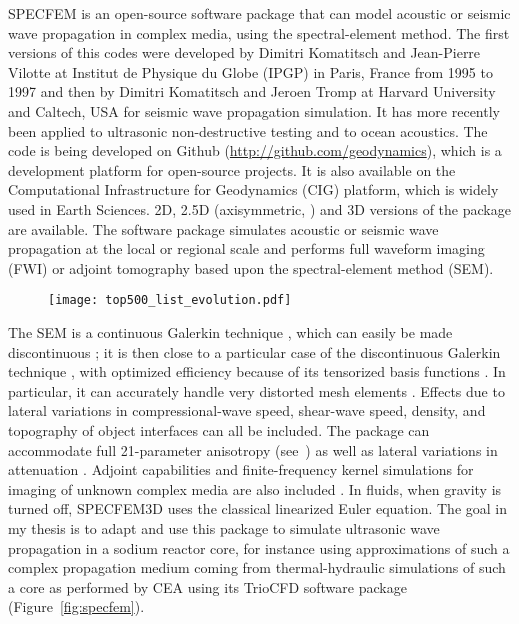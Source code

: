 SPECFEM is an open-source software package that can model acoustic or seismic wave propagation in complex media, using the spectral-element method.
The first versions of this codes were developed by Dimitri Komatitsch and Jean-Pierre Vilotte at Institut de Physique du Globe (IPGP) in Paris,
France from 1995 to 1997 and then by Dimitri Komatitsch and Jeroen Tromp at Harvard University and Caltech, USA for seismic wave propagation simulation.
It has more recently been applied to ultrasonic non-destructive testing and to ocean acoustics.
The code is being developed on Github (\url{http://github.com/geodynamics}), which is a development platform for open-source projects.
It is also available on the Computational Infrastructure for Geodynamics (CIG) platform, which is widely used in Earth Sciences.
2D, 2.5D (axisymmetric, \cite{Bottero2016Anaxisymmetrictime}) and 3D versions of the package are available.
The software package simulates acoustic or seismic wave propagation
at the local or regional scale and performs full waveform imaging (FWI) or adjoint tomography based upon the spectral-element method
(SEM).

            \begin{figure}[htbp]
                 \centerline{\texttt{[image: top500\_list\_evolution.pdf]}}
                \label{fig:top500}
            \end{figure}

The SEM is a continuous Galerkin technique \citep{TrKoLi08,Peter2011Forwardandadjoint},
which can easily be made discontinuous \citep{BeMaPa94,KoWoHu02,ChCaVi03,LaWaBe05,Kop06};
it is then close to a particular case of the discontinuous Galerkin
technique \citep{ReHi73,LeRa74,HuHuRa99,RiWh03,DuKa06},
with optimized efficiency because of its tensorized basis functions
\citep{WiStBuGh10,AcKo11}. In particular, it can accurately handle very distorted mesh elements \citep{OlSe11}.
Effects due to lateral variations in compressional-wave speed, shear-wave
speed, density, and topography of object interfaces can all be included.
The package can accommodate full 21-parameter anisotropy
(see~\citet{ChTr07}) as well as lateral variations in attenuation
\citep{SaKoTr10}. Adjoint capabilities and finite-frequency kernel
simulations for imaging of unknown complex media are also included \citep{TrKoLi08,FiIgBuKe09,ViOp09,MoChKoWa15}.
In fluids, when gravity is turned off, SPECFEM3D uses the classical linearized Euler equation.
The goal in my thesis is to adapt and use this package to simulate ultrasonic wave propagation
in a sodium reactor core, for instance using approximations of such a complex propagation medium coming from thermal-hydraulic simulations
of such a core as performed by CEA using its TrioCFD software package (Figure~\ref{fig:specfem}).

